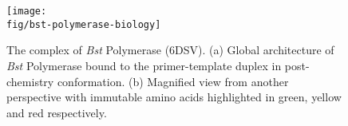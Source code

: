 \begin{figure}[h]
    \centering
    \texttt{[image: \\fig/bst-polymerase-biology]}
    \caption{The complex of \emph{Bst} Polymerase (6DSV). (a) Global architecture of \emph{Bst} Polymerase bound to the primer-template duplex in post-chemistry conformation. (b) Magnified view from another perspective with immutable amino acids highlighted in green, yellow and red respectively.}
    \label{fig:bst-polymerase-biology}
\end{figure}